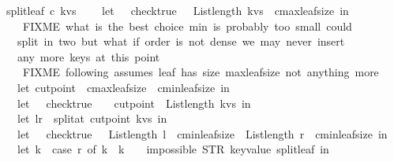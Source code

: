 \begin{isabellebody}
{\isachardoublequoteopen}split{\isacharunderscore}leaf\ c\ kvs\ {\isacharequal}\ {\isacharparenleft}\isanewline
\ \ let\ {\isacharunderscore}\ {\isacharequal}\ check{\isacharunderscore}true\ {\isacharparenleft}{\isacharpercent}\ {\isacharunderscore}{\isachardot}\ List{\isachardot}length\ kvs\ {\isasymge}\ c{\isacharbar}{\isachargreater}max{\isacharunderscore}leaf{\isacharunderscore}size{\isacharplus}{}{\isacharparenright}\ in\isanewline
\ \ {\isacharparenleft}{\isacharasterisk}\ FIXME\ what\ is\ the\ best\ choice{\isacharquery}\ min\ is\ probably\ too\ small{\isacharsemicolon}\ could\isanewline
\ \ split\ in\ two{\isacharcomma}\ but\ what\ if\ order\ is\ not\ dense{\isacharquery}\ we\ may\ never\ insert\isanewline
\ \ any\ more\ keys\ at\ this\ point\ {\isacharasterisk}{\isacharparenright}\isanewline
\ \ {\isacharparenleft}{\isacharasterisk}\ FIXME\ following\ assumes\ leaf\ has\ size\ max{\isacharunderscore}leaf{\isacharunderscore}size{\isacharplus}{}{\isacharcomma}\ not\ anything\ more{\isacharquery}\ {\isacharasterisk}{\isacharparenright}\isanewline
\ \ let\ cut{\isacharunderscore}point\ {\isacharequal}\ {\isacharparenleft}c{\isacharbar}{\isachargreater}max{\isacharunderscore}leaf{\isacharunderscore}size{\isacharplus}{}\ {\isacharminus}\ c{\isacharbar}{\isachargreater}min{\isacharunderscore}leaf{\isacharunderscore}size{\isacharparenright}\ in\ \ \isanewline
\ \ let\ {\isacharunderscore}\ {\isacharequal}\ check{\isacharunderscore}true\ {\isacharparenleft}{\isacharpercent}\ {\isacharunderscore}\ {\isachardot}\ cut{\isacharunderscore}point\ {\isasymle}\ List{\isachardot}length\ kvs{\isacharparenright}\ in\isanewline
\ \ let\ {\isacharparenleft}l{\isacharcomma}r{\isacharparenright}\ {\isacharequal}\ split{\isacharunderscore}at\ cut{\isacharunderscore}point\ kvs\ in\ \isanewline
\ \ let\ {\isacharunderscore}\ {\isacharequal}\ check{\isacharunderscore}true\ {\isacharparenleft}{\isacharpercent}\ {\isacharunderscore}{\isachardot}\ List{\isachardot}length\ l\ {\isasymge}\ c{\isacharbar}{\isachargreater}min{\isacharunderscore}leaf{\isacharunderscore}size\ {\isacharampersand}\ List{\isachardot}length\ r\ {\isasymge}\ c{\isacharbar}{\isachargreater}min{\isacharunderscore}leaf{\isacharunderscore}size{\isacharparenright}\ in\isanewline
\ \ let\ k\ {\isacharequal}\ {\isacharparenleft}case\ r\ of\ {\isacharparenleft}k{\isacharcomma}{\isacharunderscore}{\isacharparenright}{\isacharhash}{\isacharunderscore}\ {\isasymRightarrow}\ k\ {\isacharbar}\ {\isacharunderscore}\ {\isasymRightarrow}\ impossible{}\ {\isacharparenleft}STR\ {\isacharprime}{\isacharprime}key{\isacharunderscore}value{\isacharcomma}\ split{\isacharunderscore}leaf{\isacharprime}{\isacharprime}{\isacharparenright}{\isacharparenright}\ in\isanewline

\end{isabellebody}
